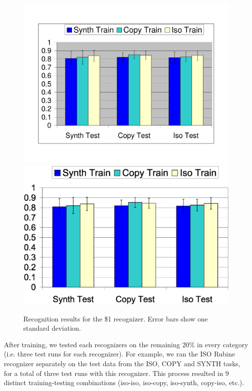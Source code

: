 \documentclass{egpubl}
\begin{document}
\begin{figure}
\ifpdf \includegraphics[width=1.0\hsize]{dollar_global_summary}
\else \includegraphics[width=1.0\hsize]{dollar_global_summary.eps} \fi
\caption{Recognition results for the \$1 recognizer.  Error bars show one standard deviation.}
\label{dollarGraph}
\end{figure}

After training, we tested each recognizers on the remaining 20\% in every category (i.e. three test runs for each recognizer).  For example, we ran the ISO Rubine recognizer separately on the test data from the ISO, COPY and SYNTH tasks, for a total of three test runs with this recognizer.  This process resulted in 9 distinct training-testing combinations (iso-iso, iso-copy, iso-synth, copy-iso, etc.).
\end{document}

